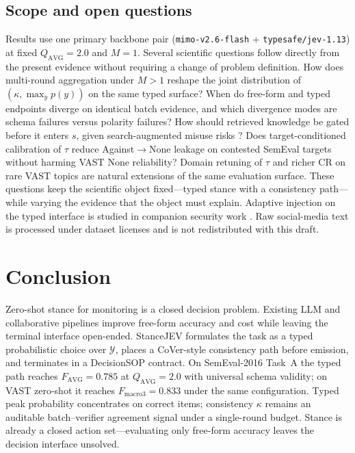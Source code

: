 \documentclass[10pt]{article}
\theoremstyle{definition}
\begin{document}
\subsection{Scope and open questions}
Results use one primary backbone pair (\texttt{mimo-v2.6-flash} + \texttt{typesafe/jev-1.13}) at fixed
$Q_{\mathrm{AVG}}{=}2.0$ and $M{=}1$.
Several scientific questions follow directly from the present evidence without requiring a change of problem
definition.
How does multi-round aggregation under $M{>}1$ reshape the joint distribution of $(\kappa,\max_y p(y))$ on
the same typed surface?
When do free-form and typed endpoints diverge on identical batch evidence, and which divergence modes are
schema failures versus polarity failures?
How should retrieved knowledge be gated before it enters $s$, given search-augmented misuse risks
\cite{yan2026searchattack,yan2025poisonswarm}?
Does target-conditioned calibration of $\tau$ reduce Against$\rightarrow$None leakage on contested SemEval
targets without harming VAST None reliability?
Domain retuning of $\tau$ and richer CR on rare VAST topics are natural extensions of the same evaluation
surface.
These questions keep the scientific object fixed---typed stance with a consistency path---while varying the
evidence that the object must explain.
Adaptive injection on the typed interface is studied in companion security work
\cite{wu2026decisionhijacking,debenedetti2024agentdojo}.
Raw social-media text is processed under dataset licenses and is not redistributed with this draft.

\section{Conclusion}
\label{sec:conclusion}

Zero-shot stance for monitoring is a closed decision problem.
Existing LLM and collaborative pipelines improve free-form accuracy and cost while leaving the terminal
interface open-ended.
StanceJEV formulates the task as a typed probabilistic choice over $\mathcal{Y}$, places a CoVer-style
consistency path before emission, and terminates in a DecisionSOP contract.
On SemEval-2016 Task~A the typed path reaches $F_{\mathrm{AVG}}{=}0.785$ at $Q_{\mathrm{AVG}}{=}2.0$ with
universal schema validity; on VAST zero-shot it reaches $F_{\mathrm{macro3}}{=}0.833$ under the same
configuration.
Typed peak probability concentrates on correct items; consistency $\kappa$ remains an auditable
batch--verifier agreement signal under a single-round budget.
Stance is already a closed action set---evaluating only free-form accuracy leaves the decision interface
unsolved.
\end{document}
